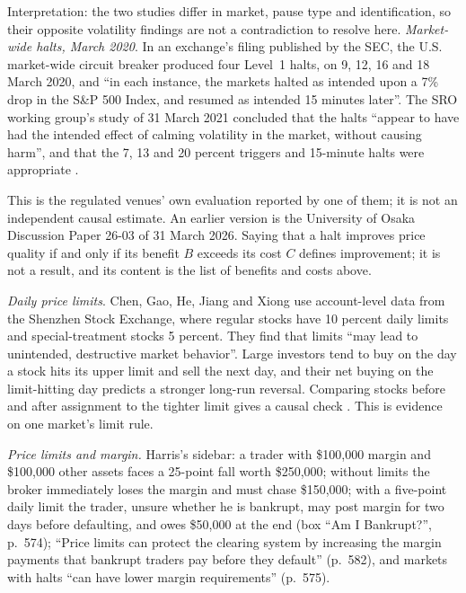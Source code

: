 \begin{qfmechanism}
Interpretation: the two studies differ in market, pause type and identification, so their opposite volatility findings are not a contradiction to resolve here. \emph{Market-wide halts, March 2020}. In an exchange's filing published by the SEC, the U.S. market-wide circuit breaker produced four Level~1 halts, on 9, 12, 16 and 18 March 2020, and ``in each instance, the markets halted as intended upon a 7\% drop in the S\&P 500 Index, and resumed as intended 15 minutes later''. The SRO working group's study of 31 March 2021 concluded that the halts ``appear to have had the intended effect of calming volatility in the market, without causing harm'', and that the 7, 13 and 20 percent triggers and 15-minute halts were appropriate \citep[Release 34-93365, 15 October 2021, public-inspection PDF pp.~4--6]{fr-cboebzx-mwcb-2021}.

This is the regulated venues' own evaluation reported by one of them; it is not an independent causal estimate. An earlier version is the University of Osaka Discussion Paper 26-03 of 31 March 2026. Saying that a halt improves price quality if and only if its benefit $B$ exceeds its cost $C$ defines improvement; it is not a result, and its content is the list of benefits and costs above.

\emph{Daily price limits}. Chen, Gao, He, Jiang and Xiong use account-level data from the Shenzhen Stock Exchange, where regular stocks have 10 percent daily limits and special-treatment stocks 5 percent. They find that limits ``may lead to unintended, destructive market behavior''. Large investors tend to buy on the day a stock hits its upper limit and sell the next day, and their net buying on the limit-hitting day predicts a stronger long-run reversal. Comparing stocks before and after assignment to the tighter limit gives a causal check \citep[NBER WP 24014, November 2017, abstract and sec.~1]{chen-gao-he-jiang-xiong-2017}. This is evidence on one market's limit rule.

 \emph{Price limits and margin.} Harris's sidebar: a trader with \$100{,}000 margin and \$100{,}000 other assets faces a 25-point fall worth \$250{,}000; without limits the broker immediately loses the margin and must chase \$150{,}000; with a five-point daily limit the trader, unsure whether he is bankrupt, may post margin for two days before defaulting, and owes \$50{,}000 at the end (box ``Am I Bankrupt?'', p.~574); ``Price limits can protect the clearing system by increasing the margin payments that bankrupt traders pay before they default'' (p.~582), and markets with halts ``can have lower margin requirements'' (p.~575).


\end{qfmechanism}
